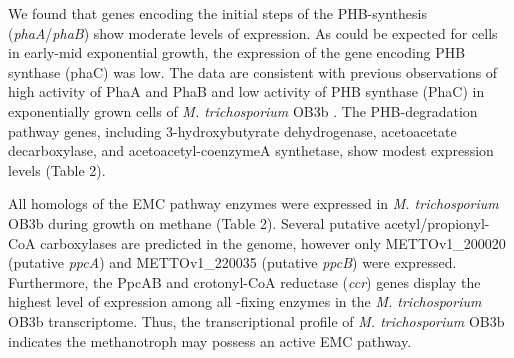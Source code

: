 We found that genes encoding the initial steps of the PHB-synthesis (\textit{phaA}/\textit{phaB}) show moderate levels of expression.
As could be expected for cells in early-mid exponential growth, the expression of the gene encoding PHB synthase (phaC) was low.
The data are consistent with previous observations of high activity of PhaA and PhaB and low activity of PHB synthase (PhaC) in exponentially grown cells of \textit{M. trichosporium} OB3b \cite{williams1998, doronina2008}.
The PHB-degradation pathway genes, including 3-hydroxybutyrate dehydrogenase, acetoacetate decarboxylase, and acetoacetyl-coenzymeA synthetase, show modest expression levels (Table 2).

All homologs of the EMC pathway enzymes were expressed in \textit{M. trichosporium} OB3b during growth on methane (Table 2).
Several putative acetyl/propionyl-CoA carboxylases are predicted in the genome, however only METTOv1\_200020 (putative \textit{ppcA}) and METTOv1\_220035 (putative \textit{ppcB}) were expressed.
Furthermore, the PpcAB and crotonyl-CoA reductase (\textit{ccr}) genes display the highest level of expression among all -fixing enzymes in the \textit{M. trichosporium} OB3b transcriptome.
Thus, the transcriptional profile of \textit{M. trichosporium} OB3b indicates the methanotroph may possess an active EMC pathway.

